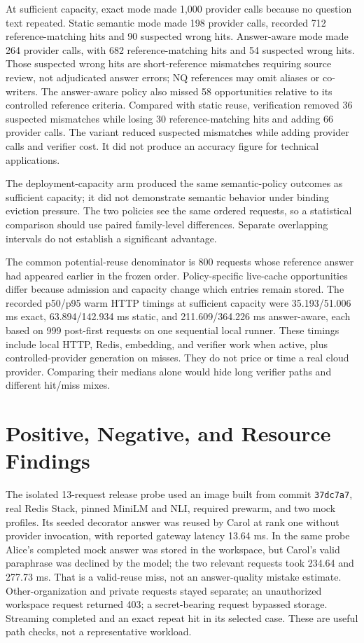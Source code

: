 At sufficient capacity, exact mode made 1,000 provider calls because no question text repeated. Static semantic mode made 198 provider calls, recorded 712 reference-matching hits and 90 suspected wrong hits. Answer-aware mode made 264 provider calls, with 682 reference-matching hits and 54 suspected wrong hits. Those suspected wrong hits are short-reference mismatches requiring source review, not adjudicated answer errors; NQ references may omit aliases or co-writers. The answer-aware policy also missed 58 opportunities relative to its controlled reference criteria. Compared with static reuse, verification removed 36 suspected mismatches while losing 30 reference-matching hits and adding 66 provider calls. The variant reduced suspected mismatches while adding provider calls and verifier cost. It did not produce an accuracy figure for technical applications.

The deployment-capacity arm produced the same semantic-policy outcomes as sufficient capacity; it did not demonstrate semantic behavior under binding eviction pressure. The two policies see the same ordered requests, so a statistical comparison should use paired family-level differences. Separate overlapping intervals do not establish a significant advantage.

The common potential-reuse denominator is 800 requests whose reference answer had appeared earlier in the frozen order. Policy-specific live-cache opportunities differ because admission and capacity change which entries remain stored. The recorded p50/p95 warm HTTP timings at sufficient capacity were 35.193/51.006 ms exact, 63.894/142.934 ms static, and 211.609/364.226 ms answer-aware, each based on 999 post-first requests on one sequential local runner. These timings include local HTTP, Redis, embedding, and verifier work when active, plus controlled-provider generation on misses. They do not price or time a real cloud provider. Comparing their medians alone would hide long verifier paths and different hit/miss mixes.

\section{Positive, Negative, and Resource Findings}
The isolated 13-request release probe used an image built from commit \texttt{37dc7a7}, real Redis Stack, pinned MiniLM and NLI, required prewarm, and two mock profiles. Its seeded decorator answer was reused by Carol at rank one without provider invocation, with reported gateway latency 13.64 ms. In the same probe Alice's completed mock answer was stored in the workspace, but Carol's valid paraphrase was declined by the model; the two relevant requests took 234.64 and 277.73 ms. That is a valid-reuse miss, not an answer-quality mistake estimate. Other-organization and private requests stayed separate; an unauthorized workspace request returned 403; a secret-bearing request bypassed storage. Streaming completed and an exact repeat hit in its selected case. These are useful path checks, not a representative workload.

